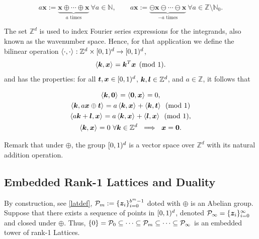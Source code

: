 \documentclass[graybox]{svmult}
\newcommand{\Z}{\mathbb{Z}} %
\newcommand{\N}{\mathbb{N}} %
\newcommand{\bszero}{\boldsymbol{0}} %
\newcommand{\bst}{\boldsymbol{t}}    %
\newcommand{\bsx}{\boldsymbol{x}}    %
\newcommand{\bsz}{\boldsymbol{z}}    %
\begin{document}
\[
a \bsx:=\underbrace{\bsx \oplus \cdots \oplus \bsx}_{a \text{ times}}\ \forall a \in \N, \qquad a \bsx:=\underbrace{\ominus\bsx \ominus \cdots \ominus \bsx}_{-a \text{ times}}\ \forall a \in \Z\setminus\N_0.
\]
 
The set $\Z^d$ is used to index Fourier series expressions for the integrands, also known as the wavenumber space. Hence, for that application we define the bilinear operation $\ip{\cdot}{\cdot}: \Z^d \times \cube \to \cube$, 
\begin{equation}\label{bilinear}
\ip{\bsk}{\bsx}=\bsk^T\bsx\pmod 1.
\end{equation}
and has the properties: for all $\bst, \bsx \in \cube$, $\bsk, \bsl \in \Z^d$, and $a \in \Z$, it follows that

\begin{subequations}
\begin{gather}
\ip{\bsk}{\bszero} = \ip{\bszero}{\bsx} = 0,\\
\ip{\bsk}{a \bsx \oplus \bst} = a\ip{\bsk}{\bsx} + \ip{\bsk}{\bst} \pmod 1 \label{bilinearlinxprop} \\
\ip{a \bsk + \bsl}{\bsx} = a\ip{\bsk}{\bsx} + \ip{\bsl}{\bsx} \pmod 1, \label{bilinearlinkprop}\\
\ip{\bsk}{\bsx} = 0 \ \forall \bsk \in \Z^d \ \implies \ \bsx=\bszero.\label{bilinearlinzeroprop}
\end{gather}
\end{subequations}

Remark that under $\oplus$, the group $[0,1)^d$ is a vector space over $\Z^d$ with its natural addition operation.

\subsection{Embedded Rank-1 Lattices and Duality}
By construction, see \eqref{latdef}, $\cp_m := \{\bsz_i\}_{i=0}^{b^m-1}$ doted with $\oplus$ is an Abelian group. Suppose that there exists a sequence of points in $[0,1)^d$, denoted $\cp_\infty =\{\bsz_i\}_{i=0}^{\infty}$ and closed under $\oplus$. Thus, $\{0\}=\mathcal{P}_0\subseteq\dots\subseteq\mathcal{P}_m\subseteq\dots\subseteq\mathcal{P}_\infty$ is an embedded tower of rank-1 Lattices.
\end{document}
